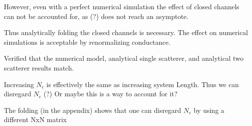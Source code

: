 However, even with a perfect numerical simulation the effect of closed channels
can not be accounted for, as (?) does not reach an asymptote.

Thus analytically folding the closed channels is necessary.  The effect on 
numerical simulations is acceptable by renormalizing conductance.

Verified that the numerical model, analytical single scatterer, and 
analytical two scatterer results match.


Increasing $N_c$ is effectively the same as increasing system Length. Thus we can 
disregard $N_c$ (?) Or maybe this is a way to account for it?

The folding (in the appendix) shows that one can disregard $N_c$ by using a 
different NxN matrix

